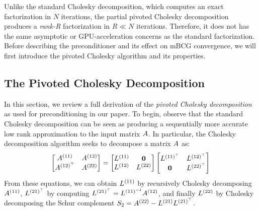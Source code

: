 Unlike the standard Cholesky decomposition, which computes an exact factorization in $N$ iterations,
the partial pivoted Cholesky decomposition produces a \emph{rank-R} factorization in $R \ll N$ iterations.
Therefore, it does not has the same asymptotic or GPU-acceleration concerns as the standard factorization.
Before describing the preconditioner and its effect on mBCG convergence, we will first introduce the pivoted Cholesky algorithm and its properties.


\subsection{The Pivoted Cholesky Decomposition}

In this section, we review a full derivation of the \emph{pivoted Cholesky decomposition} as used for preconditioning in our paper.
To begin, observe that the standard Cholesky decomposition can be seen as producing a sequentially more accurate low rank approximation to the input matrix $A$.
In particular, the Cholesky decomposition algorithm seeks to decompose a matrix $A$ as:
%
\begin{equation}
 \label{eq:cholesky_full}
 \begin{bmatrix} A^{(11)} & A^{(12)} \\ A^{(12)^\top} & A^{(22)}\end{bmatrix}
 =
 \begin{bmatrix} L^{(11)} & \mathbf{0} \\ L^{(12)} & L^{(22)}\end{bmatrix}
 \begin{bmatrix} L^{(11)^\top} & L^{(12)^\top} \\ \mathbf{0} & L^{(22)^\top}\end{bmatrix}
\end{equation}
%
From these equations, we can obtain $L^{(11)}$ by recursively Cholesky decomposing $A^{(11)}$, $L^{(21)^\top}$ by computing $L^{(21)^\top} = L^{(11)^{-1}} A^{(12)}$,
and finally $L^{(22)}$ by Cholesky decomposing the Schur complement $S_2 = A^{(22)} - L^{(21)} L^{(21)^\top}$.

